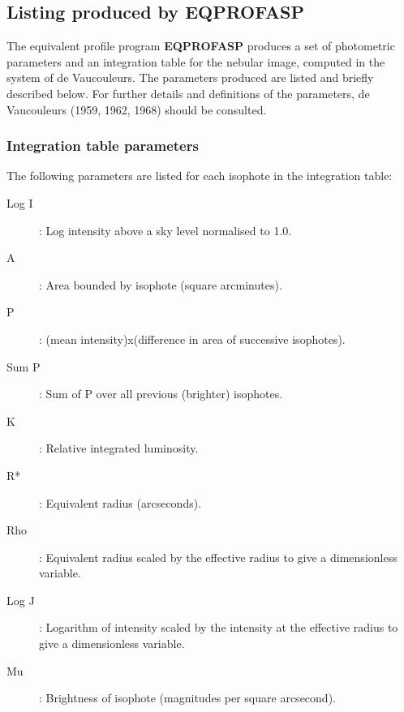 \subsection {Listing produced by EQPROFASP}
The equivalent profile program {\bf EQPROFASP} produces a set of photometric
parameters and an integration table for the nebular image, computed in the
system of de Vaucouleurs.
The parameters produced are listed and briefly described below.
For further details and definitions of the parameters, de Vaucouleurs (1959,
1962, 1968) should be consulted.
\subsubsection {Integration table parameters}
The following parameters are listed for each isophote in the integration table:
\begin{description}
\item [Log I]: Log intensity above a sky level normalised to 1.0.
\item [A]: Area bounded by isophote (square arcminutes).
\item [P]: (mean intensity)x(difference in area of successive isophotes).
\item [Sum P]: Sum of P over all previous (brighter) isophotes.
\item [K]: Relative integrated luminosity.
\item [R*]: Equivalent radius (arcseconds).
\item [Rho]: Equivalent radius scaled by the effective radius to give a
dimensionless variable.
\item [Log J]: Logarithm of intensity scaled by the intensity at the effective
radius to give a dimensionless variable.
\item [Mu]: Brightness of isophote (magnitudes per square arcsecond).
\end{description}

